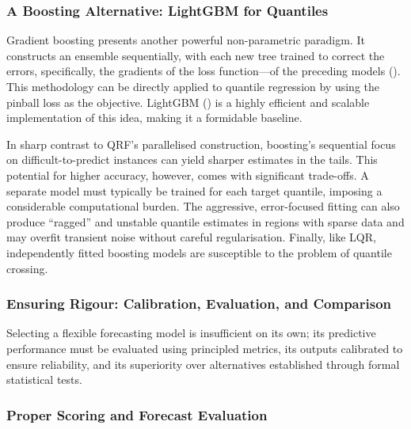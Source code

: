 \documentclass[
  a4paper,
  DIV=11,
  numbers=noendperiod]{scrreprt}
\begin{document}
\subsubsection{A Boosting Alternative: LightGBM for
Quantiles}\label{a-boosting-alternative-lightgbm-for-quantiles}

Gradient boosting presents another powerful non-parametric paradigm. It
constructs an ensemble sequentially, with each new tree trained to
correct the errors, specifically, the gradients of the loss
function---of the preceding models
(). This methodology can be
directly applied to quantile regression by using the pinball loss as the
objective. LightGBM () is a
highly efficient and scalable implementation of this idea, making it a
formidable baseline.

In sharp contrast to QRF's parallelised construction, boosting's
sequential focus on difficult-to-predict instances can yield sharper
estimates in the tails. This potential for higher accuracy, however,
comes with significant trade-offs. A separate model must typically be
trained for each target quantile, imposing a considerable computational
burden. The aggressive, error-focused fitting can also produce
``ragged'' and unstable quantile estimates in regions with sparse data
and may overfit transient noise without careful regularisation. Finally,
like LQR, independently fitted boosting models are susceptible to the
problem of quantile crossing.

\subsubsection{Ensuring Rigour: Calibration, Evaluation, and
Comparison}\label{ensuring-rigour-calibration-evaluation-and-comparison}

Selecting a flexible forecasting model is insufficient on its own; its
predictive performance must be evaluated using principled metrics, its
outputs calibrated to ensure reliability, and its superiority over
alternatives established through formal statistical tests.

\subsubsection{Proper Scoring and Forecast
Evaluation}\label{proper-scoring-and-forecast-evaluation}
\end{document}
